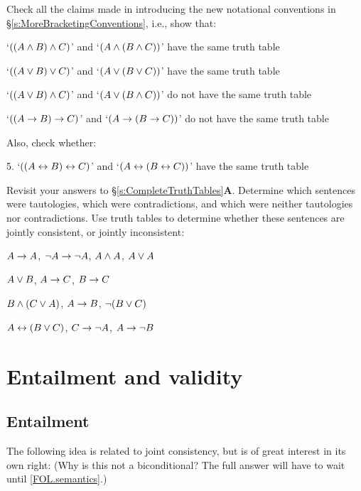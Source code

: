 \practiceproblems
\problempart
Check all the claims made in introducing the new notational conventions in §\ref{s:MoreBracketingConventions}, i.e., show that:
\begin{earg}
	\item `$((A \wedge B) \wedge C)$' and `$(A \wedge (B \wedge C))$' have the same truth table
	\item `$((A \vee B) \vee C)$' and `$(A \vee (B \vee C))$' have the same truth table
	\item `$((A \vee B) \wedge C)$' and `$(A \vee (B \wedge C))$' do not have the same truth table
	\item `$((A \rightarrow B) \rightarrow C)$' and `$(A \rightarrow (B \rightarrow C))$' do not have the same truth table
\end{earg}
Also, check whether:
\begin{earg}
	\item[5.] `$((A \leftrightarrow B) \leftrightarrow C)$' and `$(A \leftrightarrow (B \leftrightarrow C))$' have the same truth table
\end{earg}
\problempart
Revisit your answers to §\ref{s:CompleteTruthTables}\textbf{A}. Determine which sentences were tautologies, which were contradictions, and which were neither tautologies nor contradictions.
\problempart
\label{pr.TT.consistent}
Use truth tables to determine whether these sentences are jointly consistent, or jointly inconsistent:
\begin{earg}
\item $A\rightarrow A$, $\neg A \rightarrow \neg A$, $A\wedge A$, $A\vee A$ %
\item $A\vee B$, $A\rightarrow C$, $B\rightarrow C$ %
\item $B\wedge(C\vee A)$, $A\rightarrow B$, $\neg(B\vee C)$  %
\item $A\leftrightarrow(B\vee C)$, $C\rightarrow \neg A$, $A\rightarrow \neg B$ %
\end{earg}

\chapter{Entailment and validity}\label{c:entvalid}

\section{Entailment}\label{s:entailmentdt}

The following idea is related to joint consistency, but is of great interest in its own right:
	(Why is this not a biconditional? The full answer will have to wait until \ref{FOL.semantics}.)

